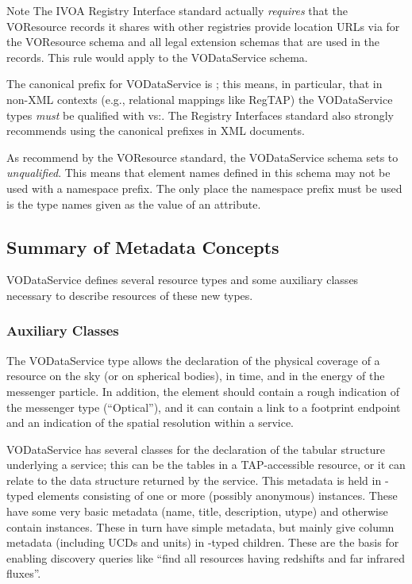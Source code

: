 \documentclass[11pt,a4paper]{ivoa}
\begin{document}
\begin{admonition}{Note}
The IVOA Registry Interface standard \citep{2018ivoa.spec.0723D}
       actually \emph{requires} that the VOResource records it
       shares with other registries provide location URLs via
        for the VOResource schema and
       all legal extension schemas that are used in the records.  This
       rule would apply to the VODataService schema.
\end{admonition}


The canonical prefix for VODataService is ; this means, in
particular, that in non-XML contexts (e.g., relational mappings
like RegTAP) the VODataService types \emph{must} be qualified with
vs:.  The Registry Interfaces standard \citep{2018ivoa.spec.0723D} also
strongly recommends using the canonical prefixes in XML documents.

As recommend by the VOResource standard, the
VODataService schema sets  to \emph{unqualified}.
This means that element names defined
in this schema may not be used with a namespace prefix.
The only place the namespace prefix must be used is the
type names given as the value of an
 attribute.  


\subsection{Summary of Metadata Concepts}
\label{sect:summ}


VODataService defines several resource types and some auxiliary classes
necessary to describe resources of these new types.

\subsubsection{Auxiliary Classes}

The VODataService type  allows the declaration of
the physical coverage of a resource on the sky (or on spherical bodies),
in time, and in the energy of the messenger particle.  In addition, the
element should contain a rough indication of the messenger type
(``Optical''), and it can contain a link to a footprint endpoint and an
indication of the spatial resolution within a service.

VODataService has several classes for the declaration of the tabular
structure underlying a service; this can be the tables in a
TAP-accessible resource,
or it can relate to the data structure returned by the service.  This
metadata is held in
-typed elements consisting 
of one or more (possibly anonymous)
 instances.  These have some very basic metadata
(name, title, description, utype) and otherwise contain 
instances.  These in turn have simple metadata, but mainly give column
metadata (including UCDs and units) in -typed
children.  These are the basis for enabling discovery queries like
``find all resources having redshifts and far infrared fluxes''.
\end{document}
